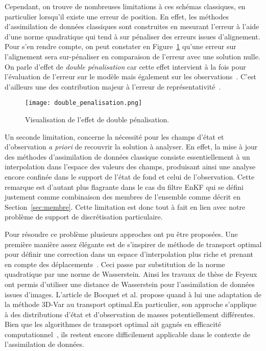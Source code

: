 Cependant, on trouve de nombreuses limitations à ces schémas classiques, en particulier lorsqu'il existe une erreur de position. En effet, les méthodes d'assimilation de données classiques sont construites en mesurant l'erreur à l'aide d'une norme quadratique qui tend à sur pénaliser des erreurs issues d'alignement. Pour s'en rendre compte, on peut constater en Figure~\ref{fig:double_penalization_error} qu'une erreur sur l'alignement sera sur-pénaliser en comparaison de l'erreur avec une solution nulle. On parle d'effet de \textit{double pénalisation} car cette effet intervient à la fois pour l'évaluation de l'erreur sur le modèle mais également sur les observations~\cite{amodei2009}. C'est d’ailleurs une des contribution majeur à l'erreur de représentativité~\cite{janjic2018}.

\begin{figure}[h]
    \centering
    \texttt{[image: double\_penalisation.png]}
    \caption{Visualisation de l'effet de double pénalisation.}
    \label{fig:double_penalization_error}
\end{figure}

Un seconde limitation, concerne la nécessité pour les champs d'état et d'observation \textit{a priori} de recouvrir la solution à analyser. En effet, la mise à jour des méthodes d'assimilation de données classique consiste essentiellement à un interpolation dans l'espace des valeurs des champs, produisant ainsi une analyse encore confinée dans le support de l'état de fond et celui de l'observation. Cette remarque est d'autant plus flagrante dans le cas du filtre EnKF qui se défini justement comme combinaison des membres de l'ensemble comme décrit en Section~\ref{sec:membre}. Cette limitation est donc tout à fait en lien avec notre problème de support de discrétisation particulaire.


Pour résoudre ce problème plusieurs approches ont pu être proposées. Une première manière assez élégante est de s'inspirer de méthode de transport optimal pour définir une correction dans un espace d'interpolation plus riche et prenant en compte des déplacements~\cite{villani2009optimal,benamou_computational_2000}. Ceci passe par substitution de la norme quadratique par une norme de Wasserstein. Ainsi les travaux de thèse de Feyeux~\cite{feyeux_transport_2016} ont permis d'utiliser une distance de Wasserstein pour l'assimilation de données issues d'images. L'article de Bocquet et al. \cite{bocquet_bridging_2023} propose quand à lui une adaptation de la méthode 3D-Var au transport optimal.En particulier, son approche s'applique à des distributions d'état et d'observation de masses potentiellement différentes. Bien que les algorithmes de transport optimal ait gagnés en efficacité computationnel~\cite{cuturi_2014,peyre_computational_2019,Simsekli2018SlicedWassersteinFN}, ils restent encore difficilement applicable dans le contexte de l'assimilation de données.

